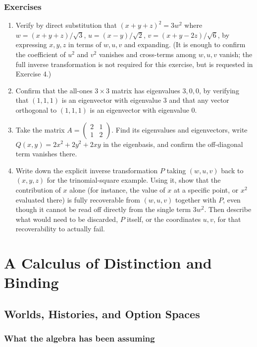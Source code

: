\documentclass[11pt]{book}
\begin{document}
\section*{Exercises}
\begin{enumerate}
\item Verify by direct substitution that $(x+y+z)^2 = 3w^2$ where $w=(x+y+z)/\sqrt3$, $u=(x-y)/\sqrt2$, $v=(x+y-2z)/\sqrt6$, by expressing $x,y,z$ in terms of $w,u,v$ and expanding. (It is enough to confirm the coefficient of $u^2$ and $v^2$ vanishes and cross-terms among $w,u,v$ vanish; the full inverse transformation is not required for this exercise, but is requested in Exercise 4.)
\item Confirm that the all-ones $3\times3$ matrix has eigenvalues $3,0,0$, by verifying that $(1,1,1)$ is an eigenvector with eigenvalue $3$ and that any vector orthogonal to $(1,1,1)$ is an eigenvector with eigenvalue $0$.
\item Take the matrix $A=\begin{pmatrix}2&1\\1&2\end{pmatrix}$. Find its eigenvalues and eigenvectors, write $Q(x,y)=2x^2+2y^2+2xy$ in the eigenbasis, and confirm the off-diagonal term vanishes there.
\item Write down the explicit inverse transformation $P$ taking $(w,u,v)$ back to $(x,y,z)$ for the trinomial-square example. Using it, show that the contribution of $x$ alone (for instance, the value of $x$ at a specific point, or $x^2$ evaluated there) is fully recoverable from $(w,u,v)$ together with $P$, even though it cannot be read off directly from the single term $3w^2$. Then describe what would need to be discarded, $P$ itself, or the coordinates $u,v$, for that recoverability to actually fail.
\end{enumerate}

\part{A Calculus of Distinction and Binding}

\chapter{Worlds, Histories, and Option Spaces}

\section{What the algebra has been assuming}
\end{document}
